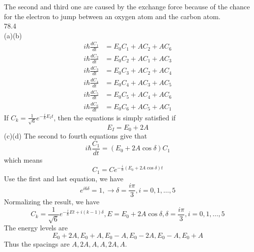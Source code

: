 \documentclass[utf8]{ctexart}
\begin{document}
\indent The second and third one are caused by the exchange force because of the chance for the electron to jump between an oxygen atom and the carbon atom.\\
78.4\\
(a)(b)\begin{align*}
	i\hbar\frac{dC_1}{dt}&=E_0C_1+AC_2+AC_6\\
	i\hbar\frac{dC_2}{dt}&=E_0C_2+AC_1+AC_3\\
	i\hbar\frac{dC_3}{dt}&=E_0C_3+AC_2+AC_4\\
	i\hbar\frac{dC_4}{dt}&=E_0C_4+AC_3+AC_5\\
	i\hbar\frac{dC_5}{dt}&=E_0C_5+AC_4+AC_6\\
	i\hbar\frac{dC_6}{dt}&=E_0C_6+AC_5+AC_1
\end{align*}
If $C_k=\frac{1}{\sqrt{6}}e^{-\frac{i}{\hbar}E_It}$, then the equations is simply satisfied if 
\[E_I=E_0+2A\]
(c)(d)
The second to fourth equations give that
\[i\hbar\frac{C_1}{dt}=(E_0+2A\cos\delta)C_1\]
which means
\[C_1=Ce^{-\frac{i}{\hbar}(E_0+2A\cos\delta)t}\]
Use the first and last equation, we have
\[e^{i6\delta}=1,\rightarrow\delta=\frac{i\pi}{3},i=0,1,\dots,5\]
Normalizing the result, we have
\[C_k=\frac{1}{\sqrt{6}}e^{-\frac{i}{\hbar}Et+i(k-1)\delta},E=E_0+2A\cos\delta,\delta=\frac{i\pi}{3},i=0,1,\dots,5\]
The energy levels are
\[E_0+2A,E_0+A,E_0-A,E_0-2A,E_0-A,E_0+A\]
Thus the spacings are $A,2A,A,A,2A,A$.
\end{document}
